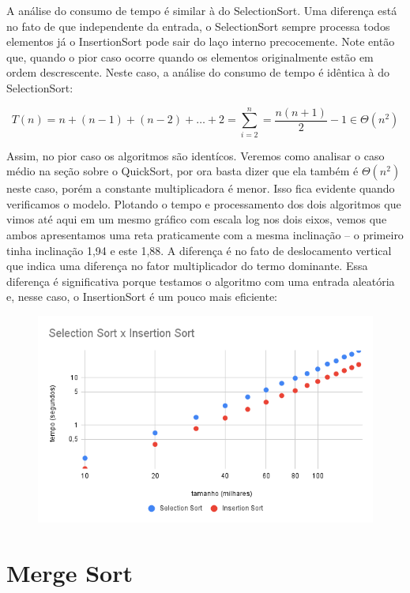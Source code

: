    A análise do consumo de tempo é similar à do SelectionSort.
   Uma diferença está no fato de que independente da entrada, o SelectionSort sempre processa todos elementos já o InsertionSort pode sair do laço interno precocemente.
   Note então que, quando o pior caso ocorre quando os elementos originalmente estão em ordem descrescente.
   Neste caso, a análise do consumo de tempo é idêntica à do SelectionSort:

   \begin{displaymath}
     T(n) = n + (n-1) + (n-2) + \dots + 2 = \sum_{i=2}^n = \frac{n(n+1)}{2} - 1 \in \Theta(n^2)
   \end{displaymath}

   Assim, no pior caso os algoritmos são identícos.
   Veremos como analisar o caso médio na seção sobre o QuickSort, por ora basta dizer que ela também é $\Theta(n^2)$ neste caso, porém a constante multiplicadora é menor.
   Isso fica evidente quando verificamos o modelo.
   Plotando o tempo e processamento dos dois algoritmos que vimos até aqui em um mesmo gráfico com escala log nos dois eixos, vemos que ambos apresentamos uma reta praticamente com a mesma inclinação -- o primeiro tinha inclinação 1,94 e este 1,88.
   A diferença é no fato de deslocamento vertical que indica uma diferença no fator multiplicador do termo dominante.
   Essa diferença é significativa porque testamos o algoritmo com uma entrada aleatória e, nesse caso, o InsertionSort é um pouco mais eficiente:

   
  \begin{figure}
    \includegraphics[width=\textwidth]{imagens/SelectionInsertion.png}
  \end{figure}   
  
\section{Merge Sort}

